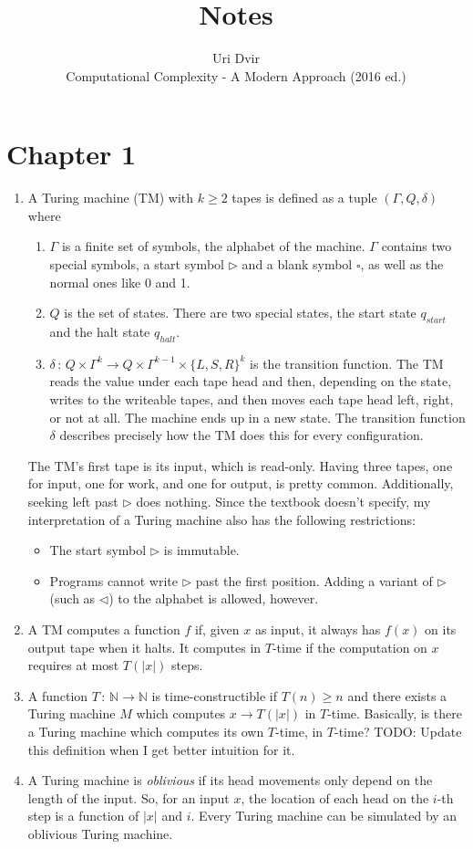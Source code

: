 \documentclass[12pt]{article}
\title{Notes}
\author{Uri Dvir \\ Computational Complexity - A Modern Approach (2016 ed.)}
\begin{document}
\maketitle

\section*{Chapter 1}

\begin{enumerate}
\item{
A Turing machine (TM) with $k \geq 2$ tapes is defined as a tuple $(\Gamma, Q, \delta)$ where
\begin{enumerate}
\item{$\Gamma$ is a finite set of symbols, the alphabet of the machine. $\Gamma$ contains two special symbols, a start symbol $\triangleright$ and a blank symbol $\square$, as well as the normal ones like 0 and 1.}
\item{$Q$ is the set of states. There are two special states, the start state $q_{start}$ and the halt state $q_{halt}$.}
\item{$\delta \,:\, Q \times \Gamma^k \rightarrow Q \times \Gamma^{k-1} \times \{ L, S, R \}^k$ is the transition function. The TM reads the value under each tape head and then, depending on the state, writes to the writeable tapes, and then moves each tape head left, right, or not at all. The machine ends up in a new state. The transition function $\delta$ describes precisely how the TM does this for every configuration.}
\end{enumerate}
The TM's first tape is its input, which is read-only. Having three tapes, one for input, one for work, and one for output, is pretty common. Additionally, seeking left past $\triangleright$ does nothing. Since the textbook doesn't specify, my interpretation of a Turing machine also has the following restrictions:
\begin{itemize}
\item{The start symbol $\triangleright$ is immutable.}
\item{Programs cannot write $\triangleright$ past the first position. Adding a variant of $\triangleright$ (such as $\triangleleft$) to the alphabet is allowed, however.}
\end{itemize}
}
\item{A TM computes a function $f$ if, given $x$ as input, it always has $f(x)$ on its output tape when it halts. It computes in $T$-time if the computation on $x$ requires at most $T(|x|)$ steps.}
\item{
A function $T \,:\, \mathbb{N} \rightarrow \mathbb{N}$ is time-constructible if $T(n) \geq n$ and there exists a Turing machine $M$ which computes $x \rightarrow T(|x|)$ in $T$-time. Basically, is there a Turing machine which computes its own $T$-time, in $T$-time? TODO: Update this definition when I get better intuition for it.
}
\item{
A Turing machine is \textit{oblivious} if its head movements only depend on the length of the input. So, for an input $x$, the location of each head on the $i$-th step is a function of $|x|$ and $i$. Every Turing machine can be simulated by an oblivious Turing machine.
}
\end{enumerate}
\end{document}
